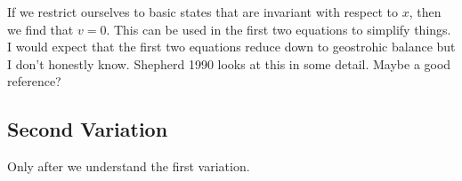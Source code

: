 \documentclass[12pt]{article}
\begin{document}
{{        If we restrict ourselves to basic states that are invariant with respect to $x$, then we find that $v= 0$.  This can be used in the first two equations to simplify things.  I would expect that the first two equations reduce down to geostrohic balance but I don't honestly know.  Shepherd 1990 looks at this in some detail.  Maybe a good reference?
    }

    \subsection{Second Variation}{
        Only after we understand the first variation.
    }
}
\end{document}
